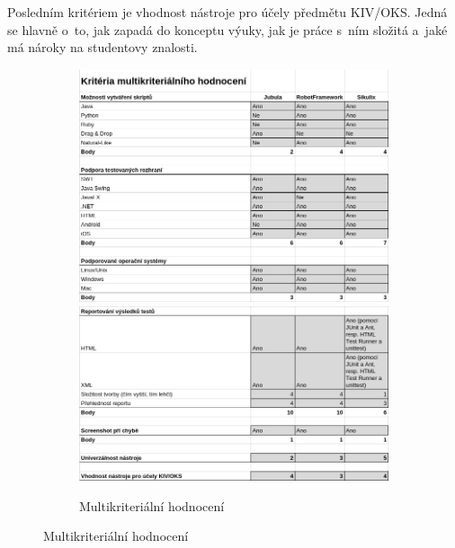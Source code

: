 \documentclass{bakalarka}
\begin{document}
Posledním kritériem je vhodnost nástroje pro účely předmětu KIV/OKS. Jedná se hlavně o~to, jak zapadá do konceptu výuky, jak je práce s~ním složitá a~jaké má nároky na studentovy znalosti.
\begin{figure}[ht]
	\begin{subfigure}{\textwidth}
		\centering
		\caption{Multikriteriální hodnocení}
		\label{MKHodn}
		\includegraphics[width=14cm]{img/Kriteria/Kriteria1.png}
		\includegraphics[width=14cm]{img/Kriteria/Kriteria2.png}
	\end{subfigure}
\end{figure}
\end{document}
